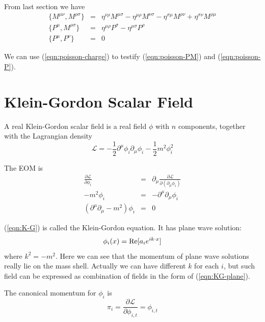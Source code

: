 \documentclass[12pt]{book}
\begin{document}
	From last section we have
	\begin{eqnarray}
		\{M^{\mu\nu},M^{\rho\sigma}\}&=&\eta^{\nu\rho}M^{\mu\sigma}-\eta^{\mu\rho}M^{\nu\sigma}-\eta^{\sigma\mu}M^{\rho\nu}+\eta^{\sigma\nu}M^{\rho\mu}\\
		\{P^\mu,M^{\rho\sigma}\}&=&\eta^{\mu\rho}P^\sigma-\eta^{\mu\sigma}P^\rho \label{eqn:poisson-PM}\\
		\{P^\mu,P^\nu\}&=&0 \label{eqn:poisson-P}
	\end{eqnarray}
	
	We can use (\ref{eqn:poisson-charge}) to testify (\ref{eqn:poisson-PM}) and (\ref{eqn:poisson-P}).
	
	\section{Klein-Gordon Scalar Field}
	A real Klein-Gordon scalar field is a real field $\phi$ with $n$ components, together with the Lagrangian density
	\begin{equation}
		\mathcal L=-\frac 12\partial^\mu\phi_i\partial_\mu\phi_i-\frac 12 m^2\phi_i^2 \label{eqn:kg-langrangian}
	\end{equation}
	
	The EOM is	
	\begin{eqnarray}
		\frac{\partial\mathcal L}{\partial \phi_i}&=&\partial_\mu\frac{\partial\mathcal L}{\partial(\partial_\mu\phi_i)}\\
		-m^2\phi_i&=&-\partial^\mu\partial_\mu\phi_i\\
		(\partial^\mu\partial_\mu-m^2)\phi_i&=&0 \label{eqn:K-G}
	\end{eqnarray}
	
	(\ref{eqn:K-G}) is called the Klein-Gordon equation. It has plane wave solution:
	\begin{equation}
		\phi_i(x)={\rm Re}[a_ie^{ik\cdot x}] \label{eqn:KG-plane}
	\end{equation}	
	where $k^2=-m^2$. Here we can see that the momentum of plane wave solutions really lie on the mass shell. Actually we can have different $k$ for each $i$, but such field can be expressed as combination of fields in the form of (\ref{eqn:KG-plane}).
	
	The canonical momentum for $\phi_i$ is
	\begin{equation}
		\pi_i=\frac{\partial\mathcal L}{\partial\phi_{i,t}}=\phi_{i,t}
	\end{equation}	
	
\end{document}
